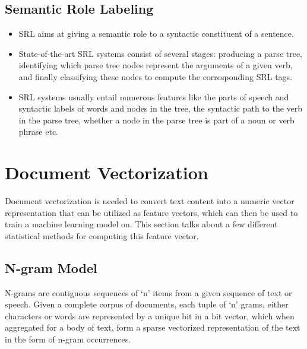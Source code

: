 \documentclass[11pt,a4paper]{article}
\begin{document}

  \subsection{Semantic Role Labeling} %
  \label{sub:semantic_role_labeling}
  
    \begin{itemize}
      \item 
      SRL aims at giving a semantic role to a syntactic constituent of a sentence.
      \item 
      State-of-the-art SRL systems consist of several stages: producing a parse tree, identifying which parse tree nodes represent the arguments of a given verb, and finally classifying these nodes to compute the corresponding SRL tags.
      \item 
      SRL systems usually entail numerous features like the parts of speech and syntactic labels of words and nodes in the tree, the syntactic path to the verb in the parse tree, whether a node in the parse tree is part of a noun or verb phrase etc.
    \end{itemize}





\section{Document Vectorization} %
\label{sec:document_vectorization}

  Document vectorization is needed to convert text content into a numeric vector representation that can be utilized as feature vectors, which can then be used to train a machine learning model on. This section talks about a few different statistical methods for computing this feature vector. \cite{SemEvalPaper}

  \subsection{N-gram Model} %
  \label{sub:n_gram_model}
    N-grams are contiguous sequences of `n' items from a given sequence of text or speech. Given a complete corpus of documents, each tuple of `n' grams, either characters or words are represented by a unique bit in a bit vector, which when aggregated for a body of text, form a sparse vectorized representation of the text in the form of n-gram occurrences.
  
\end{document}
